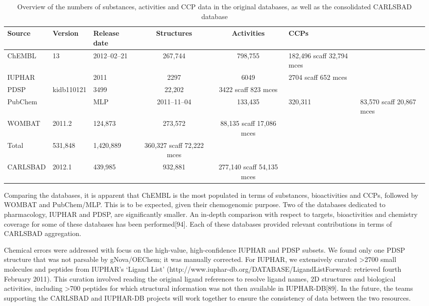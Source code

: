 \begin{table}[]
    \centering
    \begin{tabular}{lllccl}
    \hline
\textbf{Source} &	\textbf{Version} &	\textbf{Release date} &	\textbf{Structures} & \textbf{Activities} & \textbf{CCPs} \\
\hline
ChEMBL & 13 & 2012–02–21 & 267,744 & 798,755 & 182,496 scaff 32,794  mces  \\
IUPHAR & & 2011 & 2297 & 6049 & 2704 scaff 652 mces  \\
PDSP & kidb110121 &	3499 & 22,202 & 3422 scaff 823 mces  \\
PubChem & & MLP & 2011–11–04 & 133,435 & 320,311 & 83,570 scaff 20,867 mces \\
WOMBAT &	2011.2  &	 	124,873  &	273,572  &	88,135 scaff 17,086 mces  \\
Total 	  &	 	531,848  &	1,420,889  &	360,327 scaff 72,222 mces  \\
CARLSBAD  &	2012.1 	 & 	439,985  &	932,881  &	277,140 scaff 54,135 mces  \\
\hline
\end{tabular}
    \caption{Overview of the numbers of substances, activities and CCP data in the original databases, as well as the consolidated CARLSBAD database}
    \label{tab:cb_02}
\end{table}

Comparing the databases, it is apparent that ChEMBL is the most populated in terms of substances, bioactivities and CCPs, followed by WOMBAT and PubChem/MLP. This is to be expected, given their chemogenomic purpose. Two of the databases dedicated to pharmacology, IUPHAR and PDSP, are significantly smaller. An in-depth comparison with respect to targets, bioactivities and chemistry coverage for some of these databases has been performed[94]. Each of these databases provided relevant contributions in terms of CARLSBAD aggregation.

Chemical errors were addressed with focus on the high-value, high-confidence IUPHAR and PDSP subsets. We found only one PDSP structure that was not parsable by gNova/OEChem; it was manually corrected. For IUPHAR, we extensively curated >2700 small molecules and peptides from IUPHAR’s ‘Ligand List’ (http://www.iuphar-db.org/DATABASE/LigandListForward: retrieved fourth February 2011). This curation involved reading the original ligand references to resolve ligand names, 2D structures and biological activities, including >700 peptides for which structural information was not then available in IUPHAR-DB[89]. In the future, the teams supporting the CARLSBAD and IUPHAR-DB projects will work together to ensure the consistency of data between the two resources.

